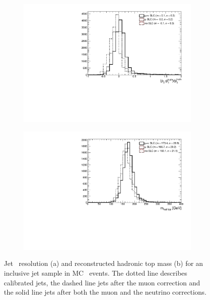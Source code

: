 \begin{figure}[tb!]
\centering
\begin{subfigure}[t]{0.49\textwidth}
 \includegraphics[width=\textwidth]{Objects/Figures/compSLC_RMS_MS_dptopt_1.pdf}
\caption{}
\end{subfigure}
\begin{subfigure}[t]{0.49\textwidth}
 \includegraphics[width=\textwidth]{Objects/Figures/compSLC_FitGaus_MS_massHadTop_corr_1.pdf}
\caption{}
\end{subfigure}
\caption{  Jet \pT\ resolution (a) and reconstructed hadronic top mass (b) for an inclusive jet sample in MC \ttbar\ events.
The dotted line describes calibrated jets, the dashed line jets after the muon correction and the solid line jets after both the muon and the neutrino corrections.}
\label{fig:OBresponse}
\end{figure} 


